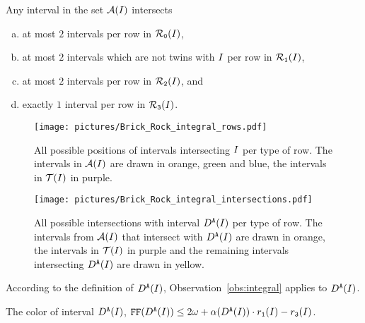 \begin{observation}
    \label{obs:integral}
    Any interval in the set $\mathcal{A}(I)$ intersects
    \begin{enumerate}[(a)]
        \item at most $2$ intervals per row in $\mathcal{R}_\texttt{0}(I)$,
        \item at most $2$ intervals which are not twins with $I$ per row in $\mathcal{R}_\texttt{1}(I)$,
        \item at most $2$ intervals per row in $\mathcal{R}_\texttt{2}(I)$, and
        \item exactly $1$ interval per row in $\mathcal{R}_\texttt{3}(I)$.
    \end{enumerate}
\end{observation}

\begin{figure}[t]
\begin{minipage}{0.4\textwidth}
\centering
\texttt{[image: pictures/Brick\_Rock\_integral\_rows.pdf]}
\caption{
All possible positions of intervals intersecting $I$ per type of row.
The intervals in $\mathcal{A}(I)$ are drawn in orange, green and blue, the intervals in $\mathcal{T}(I)$ in purple.
}
\label{fig:column_structure_in_rows}
\end{minipage}%
\hspace{0.2\textwidth}%
\begin{minipage}{0.4\textwidth}
\centering
\texttt{[image: pictures/Brick\_Rock\_integral\_intersections.pdf]}
\caption{
All possible intersections with interval $D^\texttt{A}(I)$ per type of row.
The intervals from $\mathcal{A}(I)$ that intersect with $D^\texttt{A}(I)$ are drawn in orange, the intervals in $\mathcal{T}(I)$ in purple and the remaining intervals intersecting $D^\texttt{A}(I)$ are drawn in yellow.}
\label{fig:intersections_with_v}
\end{minipage}
\end{figure}

According to the definition of $D^\texttt{A}(I)$, Observation~\ref{obs:integral} applies to $D^\texttt{A}(I)$. 


\begin{lemma}
    \label{lem:integral_uvw}
    The color of interval $D^\texttt{A}(I)$, $\text{\texttt{FF}}(D^\texttt{A}(I)) \leq 2 \omega + \alpha(D^\texttt{A}(I)) \cdot r_\texttt{1}(I) - r_\texttt{3}(I)$.
\end{lemma}


